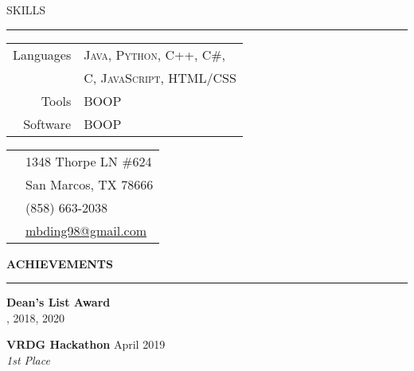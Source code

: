 \documentclass[letterpaper, 10pt]{resume}
\renewenvironment{rSection}[1]{
\sectionskip
\textcolor{blue-violet}{\MakeUppercase{#1}}
\sectionlineskip
\hrule
\begin{list}{}{
	\setlength{\leftmargin}{1.5em}
}
	\item[]
}{
\end{list}
}
\begin{document}
\begin{multicols}{2}
\begin{rSection}{Skills}
\begin{tabular}{rl}
Languages
& \textsc{Java}, \textsc{Python}, \textsc{C++}, \textsc{C\#}, \\ 
& \textsc{C}, \textsc{JavaScript}, \textsc{HTML/CSS} \\
Tools
& \textsc{BOOP} \\
Software
& \textsc{BOOP} \\

\end{tabular}
\end{rSection}

\begin{tcolorbox}[enhanced, attach boxed title to top center={yshift=-3mm,yshifttext=-1mm},
  colback=boxback, colframe=blue!75!black, colbacktitle=red!80!black,
  title=Contact Info,fonttitle=\bfseries,
  boxed title style={size=small,colframe=red!50!black} ]

 \begin{tabular}{c|p{7cm}}
	\raisebox{-1pt}{\textifsymbol{18}} & 1348 Thorpe LN \#624 \\
	 & San Marcos, TX 78666 \\ %
	{\Mobilefone} & (858) 663-2038 \\ %
	{\Letter} & \href{mailto:mbding98@gmail.com}{mbding98@gmail.com}
\end{tabular}
\end{tcolorbox}

\begin{rSection}{\bf Achievements}
\color{black}
	
	\begin{flushleft}
	{\bf Dean's List Award} \\
	{, 2018, 2020 \\ }
	\end{flushleft}
	
	\begin{flushleft}
	{\bf VRDG Hackathon} \hfill April 2019 \\
	{\raggedleft \em 1st Place \\}
	\end{flushleft}
	

\end{rSection}
\end{multicols}
\end{document}
